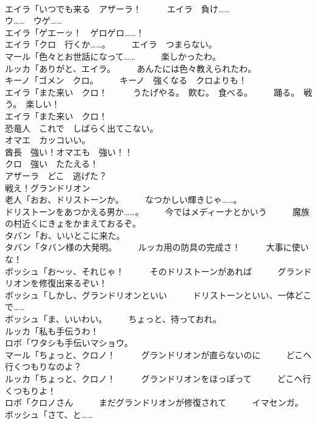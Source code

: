\documentclass[8pt]{extreport}
\begin{document}
\begin{CJK}{UTF8}{min}
\\	エイラ「いつでも来る　アザーラ！　　　エイラ　負け……	
\\	ウ……　ウゲ……	
\\	エイラ「ゲエーッ！　ゲロゲロ……！	
\\	エイラ「クロ　行くか……。　　　エイラ　つまらない。	
\\	マール「色々とお世話になって……　　　楽しかったわ。	
\\	ルッカ「ありがと、エイラ。　　　あんたには色々教えられたわ。	
\\	キーノ「ゴメン　クロ。　　　キーノ　強くなる　クロよりも！	
\\	エイラ「また来い　クロ！　　　うたげやる。　飮む。　食べる。　　　踊る。　戦う。　楽しい！	
\\	エイラ「また来い　クロ！　　　
\\	恐竜人　これで　しばらく出てこない。 
\\	オマエ　カッコいい。	
\\	酋長　強い！オマエも　強い！！	
\\	クロ　強い　たたえる！	
\\	アザーラ　どこ　逃げた？	
\\	戦え！グランドリオン	
\\	老人「おお、ドリストーンか。　　　なつかしい輝きじゃ……。	
\\	ドリストーンをあつかえる男か……。　　　今ではメディーナとかいう　　　魔族の村近くにきょをかまえておるぞ。	
\\	タバン「お、いいとこに来た。	
\\	タバン「タバン様の大発明。　　　ルッカ用の防具の完成さ！　　　大事に使いな！	
\\	ボッシュ「お～ッ、それじゃ！　　　そのドリストーンがあれば　　　グランドリオンを修復出来るぞい！	
\\	ボッシュ「しかし、グランドリオンといい　　　ドリストーンといい、一体どこで……	
\\	ボッシュ「ま、いいわい。　　　ちょっと、待っておれ。	
\\	ルッカ「私も手伝うわ！	
\\	ロボ「ワタシも手伝いマショウ。	
\\	マール「ちょっと、クロノ！　　　グランドリオンが直らないのに　　　どこへ行くつもりなのよ？	
\\	ルッカ「ちょっと、クロノ！　　　グランドリオンをほっぽって　　　どこへ行くつもりよ！	
\\	ロボ「クロノさん　　　まだグランドリオンが修復されて　　　イマセンガ。	
\\	ボッシュ「さて、と……	

\end{CJK}
\end{document}
